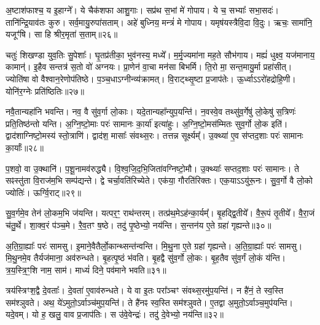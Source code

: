 अ॒ष्टाश॑फाश्च॒ य इ॒हाग्ने᳚।
ये चैक॑शफा आशु॒गाः।
सप्र॑थ स॒भां मे॑ गोपाय।
ये च॒ सभ्याः᳚ सभा॒सदः॑।
तानि॑न्द्रि॒याव॑तः कुरु।
सर्व॒मायु॒रुपा॑सताम्।
अहे॑ बुध्निय॒ मन्त्रं॑ मे गोपाय।
यमृष॑यस्त्रैवि॒दा वि॒दुः।
ऋचः॒ सामा॑नि॒ यजूꣳ॑षि।
सा हि श्रीर॒मृता॑ स॒ताम्॥२६॥

चतुः॑ शिखण्डा युव॒तिः सु॒पेशाः᳚।
घृ॒तप्र॑तीका॒ भुव॑नस्य॒ मध्ये᳚।
म॒र्मृ॒ज्यमा॑ना मह॒ते सौभ॑गाय।
मह्यं॑ धुक्ष्व॒ यज॑मानाय॒ कामान्॑।
इ॒हैव सन्तत्र॑ स॒तो वो॑ अग्नयः।
प्रा॒णेन॑ वा॒चा मन॑सा बिभर्मि।
ति॒रो मा॒ सन्त॒मायु॒र्मा प्रहा॑सीत्।
ज्योति॑षा वो वैश्वान॒रेणोप॑तिष्ठे।
प॒ञ्च॒धा\-ऽग्नीन्व्य॑क्रामत्।
वि॒राट्थ्सृ॒ष्टा प्र॒जा\-प॑तेः।
ऊ॒र्ध्वा\-ऽऽरो॑हद्रोहि॒णी।
योनि॑र॒ग्नेः प्रति॑\-ष्ठितिः॥२७॥\anuvakamend[वि॒श॒न्तु॒ नः॒ पु॒रू॒चीर्वि॑धेम नि॒धाय॒ यत्ते\-ऽप्र॑दाहाय बृह॒त्यो᳚ ब्रह्म॑णा दुवस्यत वि॒श्ववा॑र इ॒ममृ॑ञ्जते पुरो॒गां प्रज॑नयि॒ष्यथो॑ जनि॒ष्यते᳚\-ऽस्मै॒ मम॑ महि॒म्ना वर्च॑से॒ दध॑थ्सुव॒र्गो भा॑हि सम्बभू॒वतु॒रायु॒र्व्या॑नशे॒ चतु॑ष्पदः स॒तां प्र॒जा\-प॑ते॒र्द्वे च॑]

नवै॒तान्यहा॑नि भवन्ति।
नव॒ वै सु॑व॒र्गा लो॒काः।
यदे॒तान्यहा᳚न्युप॒यन्ति॑।
न॒वस्वे॒व तथ्सु॑व॒र्गेषु॑ लो॒केषु॑ स॒त्रिणः॑ प्रति॒तिष्ठ॑न्तो यन्ति।
अ॒ग्नि॒ष्टो॒माः परः॑ सामानः का॒र्या॑ इत्या॑हुः।
अ॒ग्नि॒ष्टो॒मस॑म्मितः सुव॒र्गो लो॒क इति॑।
द्वाद॑शाग्निष्टो॒मस्य॑ स्तो॒त्राणि॑।
द्वाद॑श॒ मासाः᳚ संवथ्स॒रः।
तत्तन्न सूर्क्ष्यम्᳚।
उ॒क्थ्या॑ ए॒व स॑प्तद॒शाः परः॑ सामानः का॒र्याः᳚॥२८॥

प॒शवो॒ वा उ॒क्थानि॑।
प॒शू॒नामव॑रुद्ध्यै।
वि॒श्व॒जि॒द॒भि॒जिता॑\-वग्निष्टो॒मौ।
उ॒क्थ्याः᳚ सप्तद॒शाः परः॑ सामानः।
ते सꣴस्तु॑ता वि॒राज॑म॒भि सम्प॑द्यन्ते।
द्वे चर्चा॒वति॑रिच्येते।
एक॑या॒ गौरति॑रिक्तः।
एक॒या\-ऽऽयु॑रू॒नः।
सु॒व॒र्गो वै लो॒को ज्योतिः॑।
ऊर्ग्वि॒राट्॥२९॥

सु॒व॒र्गमे॒व तेन॑ लो॒कम॒भि ज॑यन्ति।
यत्पर॒ꣳ॒ राथ॑न्तरम्।
तत्प्र॑थ॒मे\-ऽह॑न्का॒र्यम्᳚।
बृ॒हद्द्वि॒तीये᳚।
वै॒रू॒पं तृ॒तीये᳚।
वै॒रा॒जं च॑तु॒र्थे।
शा॒क्व॒रं प॑ञ्च॒मे।
रै॒व॒तꣳ ष॒ष्ठे।
तदु॑ पृ॒ष्ठेभ्यो॒ नय॑न्ति।
स॒न्तन॑य ए॒ते ग्रहा॑ गृह्यन्ते॥३०॥

अ॒ति॒ग्रा॒ह्याः᳚ परः॑ सामसु।
इ॒माने॒वैतैर्लो॒कान्थ्सन्त॑न्वन्ति।
मि॒थु॒ना ए॒ते ग्रहा॑ गृह्यन्ते।
अ॒ति॒ग्रा॒ह्याः᳚ परः॑ सामसु।
मि॒थु॒नमे॒व तैर्यज॑माना॒ अव॑रुन्धते।
बृ॒हत्पृ॒ष्ठं भ॑वति।
बृ॒हद्वै सु॑व॒र्गो लो॒कः।
बृ॒ह॒तैव सु॑व॒र्गं लो॒कं य॑न्ति।
त्र॒य॒स्त्रि॒ꣳ॒शि  नाम॒ साम॑।
माध्यं॑ दिने॒ पव॑माने भवति॥३१॥

त्रय॑स्त्रिꣳश॒द्वै दे॒वताः᳚।
दे॒वता॑ ए॒वाव॑रुन्धते।
ये वा इ॒तः परा᳚ञ्चꣳ संवथ्स॒रमु॑प॒यन्ति॑।
न है॑नं॒ ते स्व॒स्ति सम॑श्ञुवते।
अथ॒ ये॑\-ऽमुतो॒\-ऽर्वाञ्च॑मुप॒यन्ति॑।
ते है॑नꣴ स्व॒स्ति सम॑श्ञुवते।
ए॒तद्वा अ॒मुतो॒\-ऽर्वाञ्च॒मुप॑यन्ति।
यदे॒वम्।
यो ह॒ खलु॒ वाव प्र॒जा\-प॑तिः।
स उ॑वे॒वेन्द्रः॑।
तदु॑ दे॒वेभ्यो॒ नय॑न्ति॥३२॥\anuvakamend[का॒र्या॑ वि॒राड्गृ॑ह्यन्ते॒ पव॑माने भव॒तीन्द्र॒ एकं॑ च]

